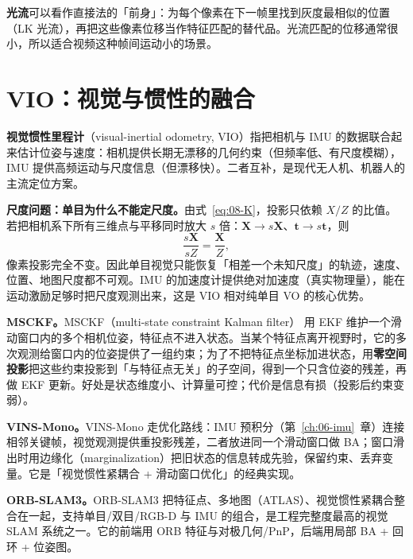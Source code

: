 \textbf{光流}可以看作直接法的「前身」：为每个像素在下一帧里找到灰度最相似的位置（LK 光流），再把这些像素位移当作特征匹配的替代品。光流匹配的位移通常很小，所以适合视频这种帧间运动小的场景。

\section{VIO：视觉与惯性的融合}\label{sec:08-vio}

\begin{definition}[VIO]
\textbf{视觉惯性里程计}（visual-inertial odometry, VIO）指把相机与 IMU 的数据联合起来估计位姿与速度：相机提供长期无漂移的几何约束（但频率低、有尺度模糊），IMU 提供高频运动与尺度信息（但漂移快）。二者互补，是现代无人机、机器人的主流定位方案。
\end{definition}

\textbf{尺度问题：单目为什么不能定尺度。}由式~\eqref{eq:08-K}，投影只依赖 $X/Z$ 的比值。若把相机系下所有三维点与平移同时放大 $s$ 倍：$\bm{X}\to s\bm{X}$、$\bm{t}\to s\bm{t}$，则
\begin{equation}
  \frac{s\bm{X}}{sZ}=\frac{\bm{X}}{Z},
\end{equation}
像素投影完全不变。因此单目视觉只能恢复「相差一个未知尺度」的轨迹，速度、位置、地图尺度都不可观。IMU 的加速度计提供绝对加速度（真实物理量），能在运动激励足够时把尺度观测出来，这是 VIO 相对纯单目 VO 的核心优势。

\textbf{MSCKF。}MSCKF（multi-state constraint Kalman filter）\cite{mourikis2007msckf} 用 EKF 维护一个滑动窗口内的多个相机位姿，特征点不进入状态。当某个特征点离开视野时，它的多次观测给窗口内的位姿提供了一组约束；为了不把特征点坐标加进状态，用\textbf{零空间投影}把这些约束投影到「与特征点无关」的子空间，得到一个只含位姿的残差，再做 EKF 更新。好处是状态维度小、计算量可控；代价是信息有损（投影后约束变弱）。

\textbf{VINS-Mono。}VINS-Mono \cite{qin2018vinsmono} 走优化路线：IMU 预积分（第~\ref{ch:06-imu}~章）连接相邻关键帧，视觉观测提供重投影残差，二者放进同一个滑动窗口做 BA；窗口滑出时用边缘化（marginalization）把旧状态的信息转成先验，保留约束、丢弃变量。它是「视觉惯性紧耦合 + 滑动窗口优化」的经典实现。

\textbf{ORB-SLAM3。}ORB-SLAM3 \cite{campos2021orbslam3} 把特征点、多地图（ATLAS）、视觉惯性紧耦合整合在一起，支持单目/双目/RGB-D 与 IMU 的组合，是工程完整度最高的视觉 SLAM 系统之一。它的前端用 ORB 特征与对极几何/PnP，后端用局部 BA + 回环 + 位姿图。

